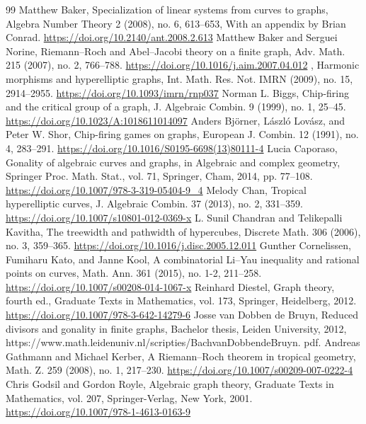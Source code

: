 \documentclass[10pt]{amsart}
\begin{document}
\begin{thebibliography}{99}
 Matthew Baker, Specialization of linear systems from curves to graphs, Algebra Number Theory 2 (2008), no. 6, 613–653, With an appendix by Brian Conrad. \url{https://doi.org/10.2140/ant.2008.2.613}
 Matthew Baker and Serguei Norine, Riemann–Roch and Abel–Jacobi theory on a ﬁnite graph, Adv. Math. 215 (2007), no. 2, 766–788. \url{https://doi.org/10.1016/j.aim.2007.04.012}
 , Harmonic morphisms and hyperelliptic graphs, Int. Math. Res. Not. IMRN (2009), no. 15, 2914–2955. \url{https://doi.org/10.1093/imrn/rnp037}
 Norman L. Biggs, Chip-ﬁring and the critical group of a graph, J. Algebraic Combin. 9 (1999), no. 1, 25–45. \url{https://doi.org/10.1023/A:1018611014097}
 Anders Björner, László Lovász, and Peter W. Shor, Chip-ﬁring games on graphs, European J. Combin. 12 (1991), no. 4, 283–291. \url{https://doi.org/10.1016/S0195-6698(13)80111-4}
 Lucia Caporaso, Gonality of algebraic curves and graphs, in Algebraic and complex geometry, Springer Proc. Math. Stat., vol. 71, Springer, Cham, 2014, pp. 77–108. \url{https://doi.org/10.1007/978-3-319-05404-9_4}
 Melody Chan, Tropical hyperelliptic curves, J. Algebraic Combin. 37 (2013), no. 2, 331–359. \url{https://doi.org/10.1007/s10801-012-0369-x}
 L. Sunil Chandran and Telikepalli Kavitha, The treewidth and pathwidth of hypercubes, Discrete Math. 306 (2006), no. 3, 359–365. \url{https://doi.org/10.1016/j.disc.2005.12.011}
 Gunther Cornelissen, Fumiharu Kato, and Janne Kool, A combinatorial Li–Yau inequality and rational points on curves, Math. Ann. 361 (2015), no. 1-2, 211–258. \url{https://doi.org/10.1007/s00208-014-1067-x}
 Reinhard Diestel, Graph theory, fourth ed., Graduate Texts in Mathematics, vol. 173, Springer, Heidelberg, 2012. \url{https://doi.org/10.1007/978-3-642-14279-6}
 Josse van Dobben de Bruyn, Reduced divisors and gonality in ﬁnite graphs, Bachelor thesis, Leiden University, 2012, https://www.math.leidenuniv.nl/scripties/BachvanDobbendeBruyn. pdf. 
 Andreas Gathmann and Michael Kerber, A Riemann–Roch theorem in tropical geometry, Math. Z. 259 (2008), no. 1, 217–230. \url{https://doi.org/10.1007/s00209-007-0222-4}
 Chris Godsil and Gordon Royle, Algebraic graph theory, Graduate Texts in Mathematics, vol. 207, Springer-Verlag, New York, 2001. \url{https://doi.org/10.1007/978-1-4613-0163-9}

\end{thebibliography}
\end{document}
